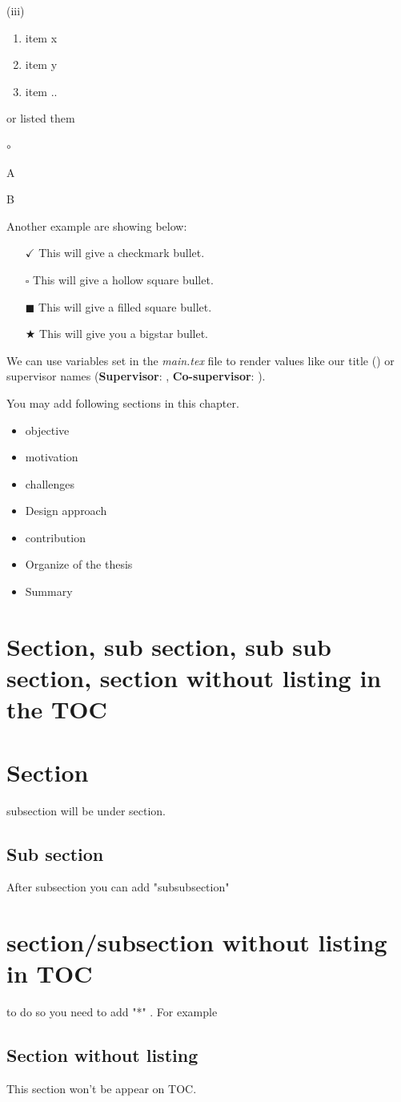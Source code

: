 (iii) \begin{enumerate}[label=\Roman*]
\item item x
  \item item y
  \item item ..
\end{enumerate}
or listed them

\begin{list}{$\circ$}{}  
\item A  
\item B  
\end{list}
Another example are showing below:
\begin{itemize}

\item[$\checkmark$] This will give a checkmark bullet.

\item[$\square$] This will give a hollow square bullet.

\item[$\blacksquare$] This will give a filled square bullet.

\item[$\bigstar$] This will give you a bigstar bullet.

\end{itemize}
We can use variables set in the \textit{main.tex} file to render values like our title (\doctitle) or supervisor names (\textbf{Supervisor}: \supervisor, \textbf{Co-supervisor}: \cosupervisor{}).

You may add following sections in this chapter.
\begin{itemize}
    \item objective
    \item motivation
    \item challenges
    \item Design approach
    \item contribution
    \item Organize of the thesis
    \item Summary
\end{itemize}
\section{Section, sub section, sub sub section, section without listing in the TOC}
\section{Section} \label{sec}
subsection will be under section.
\subsection{Sub section}\label{sub}
After subsection you can add "subsubsection"
\section{section/subsection without listing in TOC}
to do so you need to add "*" . For example
\subsection*{Section without listing}
This section won't be appear on TOC.